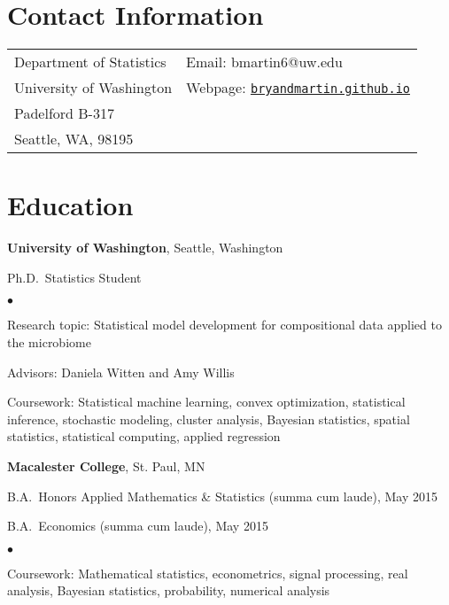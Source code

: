\documentclass[margin,centered]{res}
\newenvironment{list1}{
  \begin{list}{\ding{113}}{%
      \setlength{\itemsep}{0in}
      \setlength{\parsep}{0in} \setlength{\parskip}{0in}
      \setlength{\topsep}{0in} \setlength{\partopsep}{0in}
      \setlength{\leftmargin}{0.17in}}}{\end{list}}
\newenvironment{list2}{
  \begin{list}{$\bullet$}{%
      \setlength{\itemsep}{0in}
      \setlength{\parsep}{0in} \setlength{\parskip}{0in}
      \setlength{\topsep}{0in} \setlength{\partopsep}{0in}
      \setlength{\leftmargin}{0.2in}}}{\end{list}}
\begin{document}
\vspace*{.1in}


\begin{resume}

\section{\sc Contact Information}

\vspace{.05in}
\begin{tabular}{@{}p{2.0in}p{2.9in}}
Department of Statistics& Email:  bmartin6@uw.edu \\
University of Washington  &Webpage: \href{https://bryandmartin.github.io/}{\texttt{bryandmartin.github.io}}
\\
Padelford B-317		                   	   \\
Seattle, WA, 98195             & \\






\end{tabular}

\section{\sc Education}
{\bf University of Washington}, Seattle, Washington
\begin{list1}
\item[] 
Ph.D.~Statistics Student
\begin{list2}
\vspace*{.05in}
\item Research topic: Statistical model development for compositional data applied to the microbiome
\item Advisors: Daniela Witten and Amy Willis
\item Coursework: Statistical machine learning, convex optimization, statistical inference, stochastic modeling, cluster analysis, Bayesian statistics, spatial statistics, statistical computing, applied regression
\end{list2}
\end{list1}



{\bf Macalester College}, St. Paul, MN
\begin{list1}
\item[] B.A.~Honors Applied Mathematics \& Statistics (summa cum laude), May 2015
\item[] B.A.~Economics (summa cum laude), May 2015
\begin{list2}
\vspace*{.05in}
\item Coursework: Mathematical statistics, econometrics, signal processing, real analysis, Bayesian statistics, probability, numerical analysis
\end{list2}
\end{list1}



\end{resume}
\end{document}
